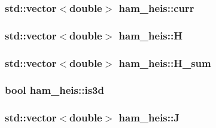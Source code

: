 \subsubsection[{\texorpdfstring{curr}{curr}}]{\setlength{\rightskip}{0pt plus 5cm}std\+::vector$<$double$>$ ham\+\_\+heis\+::curr\hspace{0.3cm}{\ttfamily [protected]}}\hypertarget{classham__heis_acbabe37ab60e2ec457106cfa49d2e1db}{}\label{classham__heis_acbabe37ab60e2ec457106cfa49d2e1db}
\subsubsection[{\texorpdfstring{H}{H}}]{\setlength{\rightskip}{0pt plus 5cm}std\+::vector$<$double$>$ ham\+\_\+heis\+::H\hspace{0.3cm}{\ttfamily [protected]}}\hypertarget{classham__heis_af22659980108a924b51aa3b02bfce7ef}{}\label{classham__heis_af22659980108a924b51aa3b02bfce7ef}
\subsubsection[{\texorpdfstring{H\+\_\+sum}{H_sum}}]{\setlength{\rightskip}{0pt plus 5cm}std\+::vector$<$double$>$ ham\+\_\+heis\+::\+H\+\_\+sum\hspace{0.3cm}{\ttfamily [protected]}}\hypertarget{classham__heis_a7c66e06dccb2686c392f5e9ddd8f6463}{}\label{classham__heis_a7c66e06dccb2686c392f5e9ddd8f6463}
\subsubsection[{\texorpdfstring{is3d}{is3d}}]{\setlength{\rightskip}{0pt plus 5cm}bool ham\+\_\+heis\+::is3d\hspace{0.3cm}{\ttfamily [protected]}}\hypertarget{classham__heis_a4c756eded6f6d3e307402c02e07f82c6}{}\label{classham__heis_a4c756eded6f6d3e307402c02e07f82c6}
\subsubsection[{\texorpdfstring{J}{J}}]{\setlength{\rightskip}{0pt plus 5cm}std\+::vector$<$double$>$ ham\+\_\+heis\+::J\hspace{0.3cm}{\ttfamily [protected]}}\hypertarget{classham__heis_aa1cd68f7e9c6e98dd2dc9106cbb68603}{}\label{classham__heis_aa1cd68f7e9c6e98dd2dc9106cbb68603}
